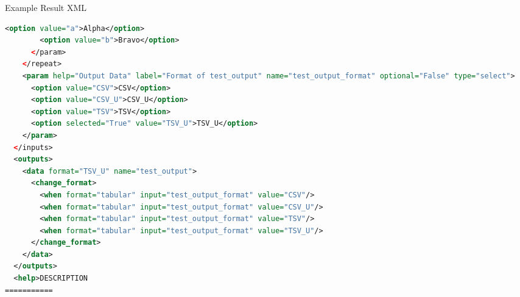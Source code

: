 \documentclass[final,t,20pt]{beamer}
\begin{document}
\begin{frame}[fragile]
\begin{columns}[t]
\begin{column}{.30\linewidth}
\begin{block}{Example Result XML}
\begin{lstlisting}[language=xml]
        <option value="a">Alpha</option>
        <option value="b">Bravo</option>
      </param>
    </repeat>
    <param help="Output Data" label="Format of test_output" name="test_output_format" optional="False" type="select">
      <option value="CSV">CSV</option>
      <option value="CSV_U">CSV_U</option>
      <option value="TSV">TSV</option>
      <option selected="True" value="TSV_U">TSV_U</option>
    </param>
  </inputs>
  <outputs>
    <data format="TSV_U" name="test_output">
      <change_format>
        <when format="tabular" input="test_output_format" value="CSV"/>
        <when format="tabular" input="test_output_format" value="CSV_U"/>
        <when format="tabular" input="test_output_format" value="TSV"/>
        <when format="tabular" input="test_output_format" value="TSV_U"/>
      </change_format>
    </data>
  </outputs>
  <help>DESCRIPTION
===========


\end{lstlisting}
\end{block}
\end{column}
\end{columns}
\end{frame}
\end{document}
